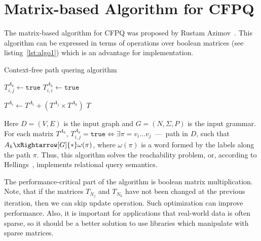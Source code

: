 \section{Matrix-based Algorithm for CFPQ}

The matrix-based algorithm for CFPQ was proposed by Rustam Azimov~\cite{Azimov:2018:CPQ:3210259.3210264}.
This algorithm can be expressed in terms of operations over boolean matrices (see listing~\ref{lst:algo1}) which is an advantage for implementation.
{\small
\begin{algorithm}
\begin{algorithmic}[1]
\caption{Context-free path quering algorithm}
\label{lst:algo1}
          {$T^{A_k}_{i,j} \gets \texttt{true}$}
    \EndFor
       {$T^{A_k}_{i,i} \gets \texttt{true}$}
    \EndFor

          {$T^{A_i} \gets T^{A_i} + (T^{A_j} \times T^{A_k})$}
        \EndFor
    \EndWhile
\State \Return $T$
\EndFunction
\end{algorithmic}
\end{algorithm}
}

Here $D = (V, E)$ is the input graph and $G = (N,\Sigma,P)$ is the input grammar.
For each matrix $T^{A_k}$, $T^{A_k}_{i,j} = \texttt{true} \iff \exists \pi = v_i \ldots v_j $~---~path in $D$, such that $A_k \xRightarrow[G]{*} \omega(\pi) $, where $\omega(\pi)$ is a word formed by the labels along the path $\pi$.
Thus, this algorithm solves the reachability problem, or, according to Hellings~\cite{hellingsRelational}, implements relational query semantics.

The performance-critical part of the algorithm is boolean matrix multiplication.
Note, that if the matrices $T_{N_j}$ and $T_{N_k}$ have not been changed at the previous iteration, then we can skip update operation.
Such optimization can improve performance.
Also, it is important for applications that real-world data is often sparse, so it should be a better solution to use libraries which manipulate with sparse matrices.
